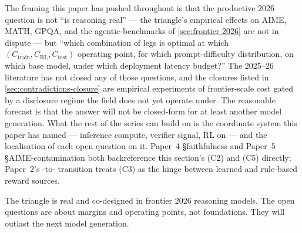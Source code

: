 The framing this paper has pushed throughout is that the productive
2026 question is not ``is reasoning real'' --- the triangle's
empirical effects on AIME, MATH, GPQA, and the agentic-benchmarks of
\cref{sec:frontier-2026} are not in dispute --- but ``which combination
of legs is optimal at which $(C_\text{train}, C_\text{RL}, C_\text{test})$
operating point, for which prompt-difficulty distribution, on which
base model, under which deployment latency budget?'' The 2025--26
literature has not closed any of those questions, and the closures
listed in \cref{sec:contradictions-closure} are empirical experiments
of frontier-scale cost gated by a disclosure regime the field does not
yet operate under. The reasonable forecast is that the answer will not
be closed-form for at least another model generation. What the rest of
the series can build on is the coordinate system this paper has named
--- inference compute, verifier signal, RL on  --- and
the localisation of each open question on it. Paper~4
\S faithfulness and Paper~5 \S AIME-contamination both backreference
this section's (C2) and (C5) directly; Paper~2's -to-
transition treats (C3) as the hinge between learned and rule-based
reward sources.

The triangle is real and co-designed in frontier 2026 reasoning
models. The open questions are about margins and operating points,
not foundations. They will outlast the next model generation.
